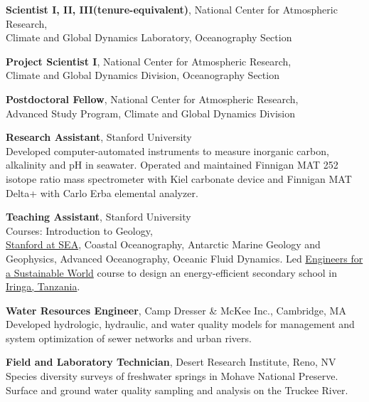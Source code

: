 \documentclass[11pt]{article}
\begin{document}
\begin{description}[style=multiline,leftmargin=2.5cm,font=\normalfont]
\item[2014--2022] \textbf{Scientist I, II, III(tenure-equivalent)},
	{National Center for Atmospheric Research}, \\
	{Climate and Global Dynamics Laboratory},
	{Oceanography Section}

\item[2012--2014] \textbf{Project Scientist I},
	{National Center for Atmospheric Research}, \\
	{Climate and Global Dynamics Division},
	{Oceanography Section}

\item[2010--2012] \textbf{Postdoctoral Fellow},
	{National Center for Atmospheric Research}, \\
	{Advanced Study Program}, {Climate and Global Dynamics Division}

\item[2005--2010] \textbf{Research Assistant}, Stanford University\\
	Developed computer-automated instruments to measure
	inorganic carbon, alkalinity and pH in seawater.
	Operated and maintained Finnigan MAT 252 isotope ratio mass spectrometer
	with Kiel carbonate device and Finnigan MAT Delta+ with Carlo Erba elemental analyzer.

\item[2004--2009] \textbf{Teaching Assistant}, Stanford University \\
	Courses: Introduction to Geology,\\
	\href{http://stanford.sea.edu/}{Stanford at SEA},
	Coastal Oceanography, Antarctic Marine Geology and Geophysics,
	Advanced Oceanography, Oceanic Fluid Dynamics.
	Led \href{http://esw.stanford.edu}{Engineers for a Sustainable World} course to
	design an energy-efficient secondary school in
	\href{http://g.co/maps/d9q9a}{Iringa, Tanzania}.

\item[2003--2004] \textbf{Water Resources Engineer},
	{Camp Dresser \& McKee Inc.}, Cambridge, MA\\
	Developed hydrologic, hydraulic, and water quality models for
	management and system optimization of sewer networks and urban rivers.

\item[2003] \textbf{Field and Laboratory Technician},
	{Desert Research Institute}, Reno, NV
	Species diversity surveys of freshwater springs in Mohave National Preserve. \\
	Surface and ground water quality sampling and analysis on the Truckee River.


\end{description}
\end{document}
